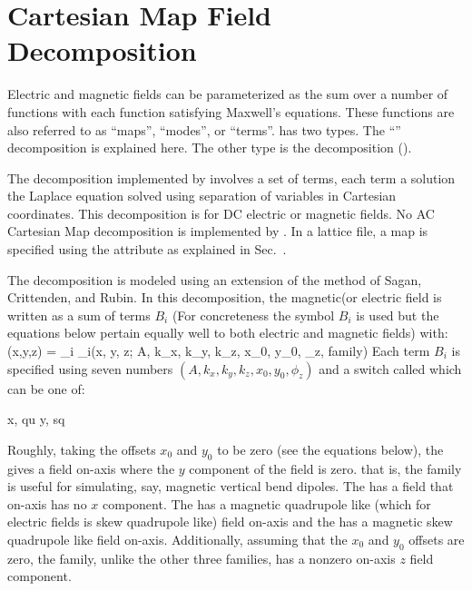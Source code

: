 \section{Cartesian Map Field Decomposition}
\label{s:cart.map.phys}

Electric and magnetic fields can be parameterized as the sum over a number of functions
with each function satisfying Maxwell's equations. These functions are also referred to as
``maps'', ``modes'', or ``terms''. \bmad has two types. The ``''
decomposition is explained here. The other type is the  decomposition
().

The  decomposition implemented by \bmad involves a set of terms, each
term a solution the Laplace equation solved using separation of variables in Cartesian
coordinates. This decomposition is for DC electric or magnetic fields. No AC Cartesian Map
decomposition is implemented by \bmad. In a lattice file, a  map is specified using
the  attribute as explained in Sec.~.

The  decomposition is modeled using an extension of the method of Sagan,
Crittenden, and Rubin\cite{b:wiggler}. In this decomposition, the magnetic(or electric
field is written as a sum of terms $B_i$ (For concreteness the symbol $B_i$ is used but
the equations below pertain equally well to both electric and magnetic fields) with:
\Begineq
  \bfB(x,y,z) = \sum_i \bfB_i(x, y, z; A, k_x, k_y, k_z, x_0, y_0, \phi_z, family)
\Endeq
Each term $B_i$ is specified using seven numbers $(A, k_x, k_y, k_z,
x_0, y_0, \phi_z)$ and a switch called  which can be one of:
\begin{example}
  x,  qu
  y,  sq
\end{example}
Roughly, taking the offsets $x_0$ and $y_0$ to be zero (see the equations below), the 
 gives a field on-axis where the $y$ component of the field is zero. that is, the 
family is useful for simulating, say, magnetic vertical bend dipoles. The   has a
field that on-axis has no $x$ component. The   has a magnetic quadrupole like
(which for electric fields is skew quadrupole like) field on-axis and the   has a
magnetic skew quadrupole like field on-axis. Additionally, assuming that the $x_0$ and $y_0$ offsets
are zero, the  family, unlike the other three families, has a nonzero on-axis $z$ field
component.

